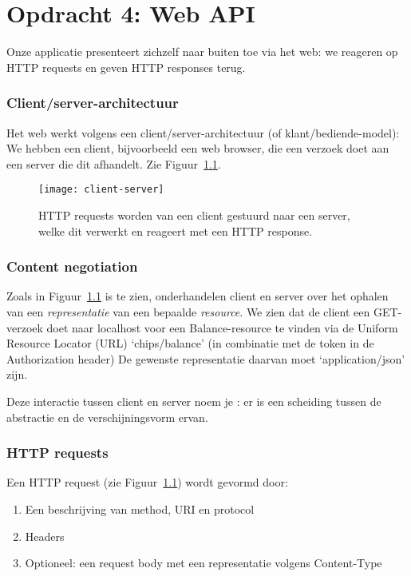 \chapter{Opdracht 4: Web API}
Onze applicatie presenteert zichzelf naar buiten toe via het web:
we reageren op HTTP requests en geven HTTP responses terug.

\subsection{Client/server-architectuur}
Het web werkt volgens een client/server-architectuur (of klant/bediende-model):
We hebben een client, bijvoorbeeld een web browser, die een verzoek doet 
aan een server die dit afhandelt. Zie Figuur~\ref{fig:client-server}.

\begin{figure}[H]
    \centering
    \texttt{[image: client-server]}
    \caption{HTTP requests worden van een client gestuurd naar een server, welke dit verwerkt en reageert met een HTTP response.}
    \label{fig:client-server}
\end{figure}

\subsection{Content negotiation}
Zoals in Figuur~\ref{fig:client-server} is te zien, 
onderhandelen client en server over het ophalen van een \textit{representatie}
van een bepaalde \textit{resource}. We zien dat de client een 
GET-verzoek doet naar localhost voor een Balance-resource te
vinden via de Uniform Resource Locator (URL) `chips/balance'
(in combinatie met de token in de Authorization header)
De gewenste representatie daarvan moet `application/json' zijn.

Deze interactie tussen client en server noem je :
er is een scheiding tussen de abstractie en de verschijningsvorm ervan.

\subsection{HTTP requests}
Een HTTP request (zie Figuur~\ref{fig:client-server}) wordt gevormd door:
\begin{enumerate}
    \item Een beschrijving van method, URI en protocol
    \item Headers
    \item Optioneel: een request body met een representatie volgens Content-Type
\end{enumerate}


